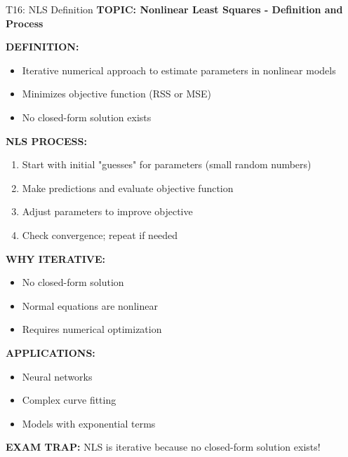 \documentclass[8pt]{beamer}
\begin{document}
	\begin{frame}{T16: NLS Definition}
		\fontsize{6.5}{7.5}\selectfont
		\textbf{TOPIC: Nonlinear Least Squares - Definition and Process}
		
		\vspace{0.1cm}
		\textbf{DEFINITION:}
		\begin{itemize}
			\item Iterative numerical approach to estimate parameters in nonlinear models
			\item Minimizes objective function (RSS or MSE)
			\item No closed-form solution exists
		\end{itemize}
		
		\vspace{0.1cm}
		\textbf{NLS PROCESS:}
		\begin{enumerate}
			\item Start with initial "guesses" for parameters (small random numbers)
			\item Make predictions and evaluate objective function
			\item Adjust parameters to improve objective
			\item Check convergence; repeat if needed
		\end{enumerate}
		
		\vspace{0.1cm}
		\textbf{WHY ITERATIVE:}
		\begin{itemize}
			\item No closed-form solution
			\item Normal equations are nonlinear
			\item Requires numerical optimization
		\end{itemize}
		
		\vspace{0.1cm}
		\textbf{APPLICATIONS:}
		\begin{itemize}
			\item Neural networks
			\item Complex curve fitting
			\item Models with exponential terms
		\end{itemize}
		
		\textcolor{myred}{\textbf{EXAM TRAP:}} NLS is \textcolor{myblue}{iterative} because no closed-form solution exists!
	\end{frame}
	
\end{document}
